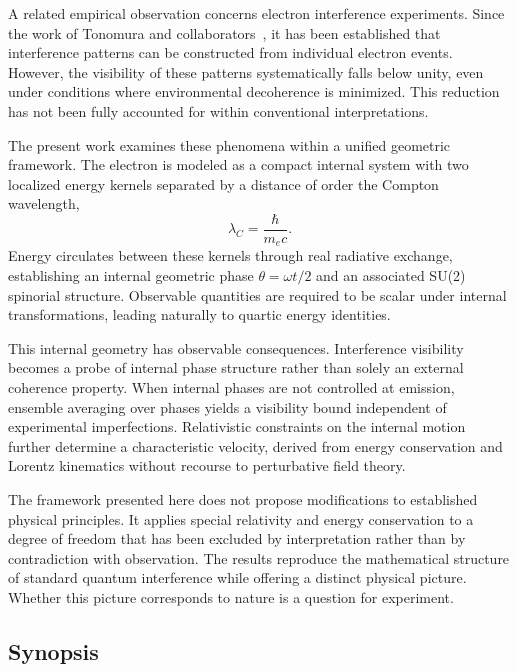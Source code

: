 \documentclass[%
 reprint,
 amsmath,amssymb,
 aps,
 prb,
]{revtex4-2}
\numberwithin{equation}{section}
\begin{document}
A related empirical observation concerns electron interference experiments. Since the work of Tonomura and collaborators~\cite{Tonomura1989}, it has been established that interference patterns can be constructed from individual electron events. However, the visibility of these patterns systematically falls below unity, even under conditions where environmental decoherence is minimized. This reduction has not been fully accounted for within conventional interpretations.

The present work examines these phenomena within a unified geometric framework. The electron is modeled as a compact internal system with two localized energy kernels separated by a distance of order the Compton wavelength,
\begin{equation}
\lambda_C = \frac{\hbar}{m_e c}.
\label{eq:compton_wavelength}
\end{equation}
Energy circulates between these kernels through real radiative exchange, establishing an internal geometric phase $\theta = \omega t/2$ and an associated SU(2) spinorial structure. Observable quantities are required to be scalar under internal transformations, leading naturally to quartic energy identities.

This internal geometry has observable consequences. Interference visibility becomes a probe of internal phase structure rather than solely an external coherence property. When internal phases are not controlled at emission, ensemble averaging over phases yields a visibility bound independent of experimental imperfections. Relativistic constraints on the internal motion further determine a characteristic velocity, derived from energy conservation and Lorentz kinematics without recourse to perturbative field theory.

The framework presented here does not propose modifications to established physical principles. It applies special relativity and energy conservation to a degree of freedom that has been excluded by interpretation rather than by contradiction with observation. The results reproduce the mathematical structure of standard quantum interference while offering a distinct physical picture. Whether this picture corresponds to nature is a question for experiment.


\subsection*{Synopsis}
\label{subsec:synopsis}
\end{document}
